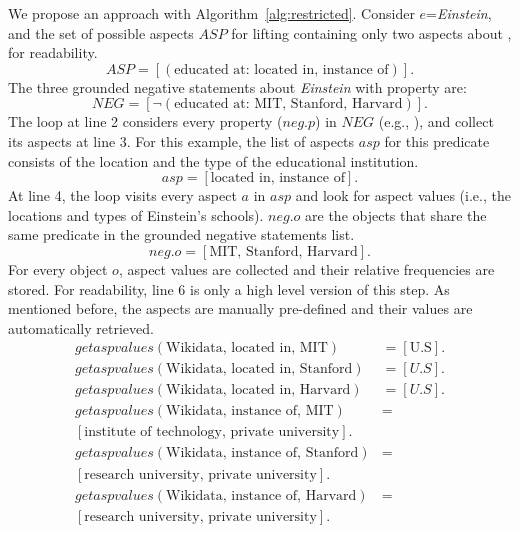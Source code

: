 We propose an approach with Algorithm~\ref{alg:restricted}. Consider $e$=\emph{Einstein}, and the set of possible aspects $\mathit{ASP}$ for lifting containing only two aspects about , for readability. 
\begin{equation*}
ASP = [(\text{educated at: located in, instance of})].
\end{equation*}
The three grounded negative statements about \emph{Einstein} with  property are:
\begin{equation*}
\mathit{NEG}=[\neg(\text{educated at: MIT, Stanford, Harvard})].
\end{equation*}
The loop at line 2 considers every property ($neg.p$) in $\mathit{NEG}$ (e.g., ), and collect its aspects at line 3. For this example, the list of aspects $asp$ for this predicate consists of the location and the type of the educational institution.
\begin{equation*}
asp=[\text{located in, instance of}].
\end{equation*}
At line 4, the loop visits every aspect $a$ in $asp$ and look for aspect values (i.e., the locations and types of Einstein's schools). $neg.o$ are the objects that share the same predicate in the grounded negative statements list.
\begin{equation*}
neg.o=[\text{MIT, Stanford, Harvard}].
\end{equation*}
For every object $o$, aspect values are collected and their relative frequencies are stored. For readability, line 6 is only a high level version of this step. As mentioned before, the aspects are manually pre-defined and their values are automatically retrieved.
\begin{equation*}
 \begin{aligned}
getaspvalues(\text{Wikidata, located in, MIT}) &= [\text{U.S}].\\ 
getaspvalues(\text{Wikidata, located in, Stanford}) &= [U.S].\\
getaspvalues(\text{Wikidata, located in, Harvard}) &= [U.S].\\
getaspvalues(\text{Wikidata, instance of, MIT}) &=\\ [\text{institute of technology, private university}].\\
getaspvalues(\text{Wikidata, instance of, Stanford}) &=\\ [\text{research university, private university}].\\
getaspvalues(\text{Wikidata, instance of, Harvard}) &=\\ [\text{research university, private university}].\\
 \end{aligned}
\end{equation*}
